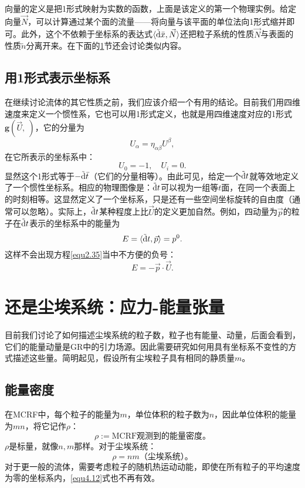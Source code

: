向量的定义是把1形式映射为实数的函数，上面是该定义的第一个物理实例。给定向量$\vec{N}$，可以计算通过某个面的流量——将向量与该平面的单位法向1形式缩并即可。此外，这个不依赖于坐标系的表达式$\langle \tilde{\mathrm{d}} \bar{x}, \vec{N} \rangle$还把粒子系统的性质$\vec{N}$与表面的性质$\tilde{n}$分离开来。在下面的\ref{sec4.4}节还会讨论类似内容。

\subsection*{用1形式表示坐标系}
在继续讨论流体的其它性质之前，我们应该介绍一个有用的结论。目前我们用四维速度来定义一个惯性系，它也可以用1形式定义，也就是用四维速度对应的1形式$\mathbf{g} (\vec{U}, \ )$，它的分量为
\[
    U_\alpha = \eta_{\alpha \beta} U^\beta,
\]
在它所表示的坐标系中：
\[
    U_0 = -1, \quad U_i = 0.
\]
显然这个1形式等于$-\tilde{\mathrm{d}} \bar{t}$（它们的分量相等）。由此可见，给定一个$\tilde{\mathrm{d}} t$就等效地定义了一个惯性坐标系。相应的物理图像是：$\tilde{\mathrm{d}} t$可以视为一组等$t$面，在同一个表面上的时刻相等。这显然定义了一个坐标系，只是还有一些空间坐标旋转的自由度（通常可以忽略）。实际上，$\tilde{\mathrm{d}} t$某种程度上比$\vec{U}$的定义更加自然。例如，四动量为$\vec{p}$的粒子在$\tilde{\mathrm{d}} t$表示的坐标系中的能量为
\begin{equation}
    E = \langle \tilde{\mathrm{d}} t, \vec{p} \rangle = p^0.
\label{equ4.10}
\end{equation}
这样不会出现方程\eqref{equ2.35}当中不方便的负号：
\[
    E = -\vec{p} \cdot \vec{U}.
\]

\section{还是尘埃系统：应力-能量张量}
\label{sec4.4}
目前我们讨论了如何描述尘埃系统的粒子数，粒子也有能量、动量，后面会看到，它们的能量动量是GR中的引力场源。因此需要研究如何用具有坐标系不变性的方式描述这些量。简明起见，假设所有尘埃粒子具有相同的静质量$m$。

\subsection*{能量密度}
在MCRF中，每个粒子的能量为$m$，单位体积的粒子数为$n$，因此单位体积的能量为$mn$，将它记作$\rho$：
\begin{equation}
    \rho := \text{MCRF观测到的能量密度。}
\label{equ4.11}
\end{equation}
$\rho$是标量，就像$n, m$那样。对于尘埃系统：
\begin{equation}
    \rho = nm \text{（尘埃系统）。}
\label{equ4.12}
\end{equation}
对于更一般的流体，需要考虑粒子的随机热运动动能，即使在所有粒子的平均速度为零的坐标系内，\eqref{equ4.12}式也不再有效。

